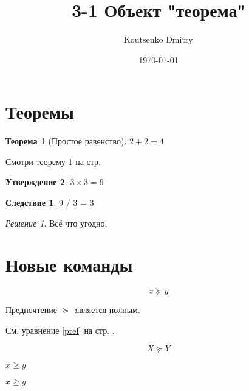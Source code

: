 \documentclass[a4paper,12pt]{article}                       %
\title{3-1 Объект "теорема"}
\author{Koutsenko Dmitry}
\date{\today}
\theoremstyle{plain}                                        %
\newtheorem{theorem}{Теорема}[section]
\newtheorem{proposition}[theorem]{Утверждение}
\theoremstyle{definition}                                   %
\newtheorem{corollary}{Следствие}[theorem]
\theoremstyle{remark}                                       %
\newtheorem*{nonum}{Решение}
\begin{document}

\maketitle

\section{Теоремы}

\begin{theorem}[Простое равенство]\label{theorem1}
    $2+2=4$
\end{theorem}

Смотри теорему \ref{theorem1} на стр. \pageref{theorem1}

\begin{proposition}
    $3\times 3 = 9$
\end{proposition}

\begin{corollary}
    9 / 3 = 3
\end{corollary}

\begin{nonum}
    Всё что угодно.
\end{nonum}


\section{Новые команды}

\newcommand{\nw}{\ensuremath{\succcurlyeq}}

\begin{equation}\label{pref}
    x \nw y
\end{equation}

Предпочтение \nw\ является полным.

\newcommand{\str}[1]{%
    на стр. \pageref{#1}%
}

См. уравнение \eqref{pref} \str{pref}.

\newcommand{\qwerty}[2][X]{%
    \begin{equation}
        #1 \nw #2
    \end{equation}
}

\qwerty{Y}

$x \ge y$

\renewcommand{\ge}{\geqslant}

$x \ge y$
\end{document}
